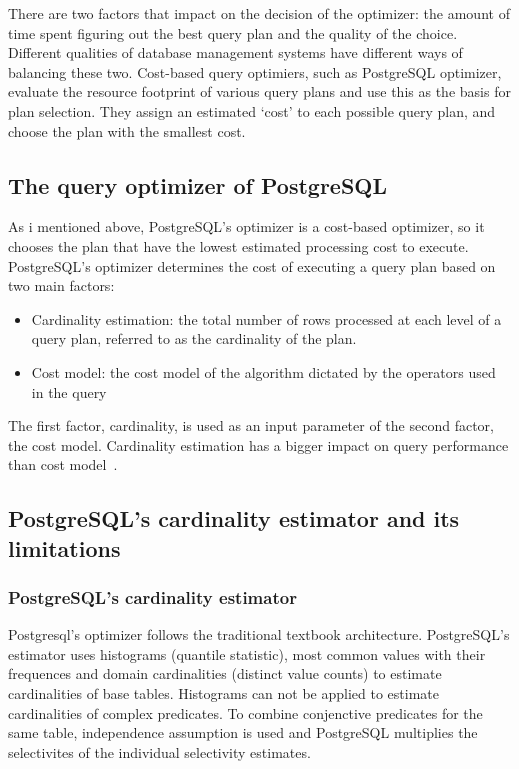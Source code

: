 There are two factors that impact on the decision of the optimizer: the amount of time spent 
figuring out the best query plan and  the quality of the choice. Different qualities of database 
management systems have different ways of balancing these two. Cost-based query optimiers, such as 
PostgreSQL optimizer, evaluate the resource footprint of various query plans and use this as the 
basis for plan selection. They assign an estimated `cost' to each possible query plan, and choose 
the plan with the smallest cost. 

\subsection{The query optimizer of PostgreSQL}

As i mentioned above, PostgreSQL's optimizer is a cost-based optimizer, so it
chooses the plan that have the lowest estimated processing cost to execute.
PostgreSQL's optimizer determines the cost of executing a query plan based on
two main factors:

\begin{itemize}
    \item Cardinality estimation: the total number of rows processed at each
        level of a query plan, referred to as the cardinality of the plan.
    \item Cost model: the cost model of the algorithm dictated by the operators
        used in the query
\end{itemize}

The first factor, cardinality, is used as an input parameter of the second
factor, the cost model. Cardinality estimation has a bigger impact on query
performance than cost model~\cite{adaptive cardinality estimation}.

\subsection{PostgreSQL's cardinality estimator and its limitations}

\subsubsection{PostgreSQL's cardinality estimator}

Postgresql's optimizer follows the traditional textbook architecture. PostgreSQL's estimator
uses histograms (quantile statistic), most common values with their frequences and domain
cardinalities (distinct value counts) to estimate cardinalities of base tables. Histograms
can not be applied to estimate cardinalities of complex predicates. To combine conjenctive predicates
for the same table, independence assumption is used and PostgreSQL multiplies the selectivites of the
individual selectivity estimates.

